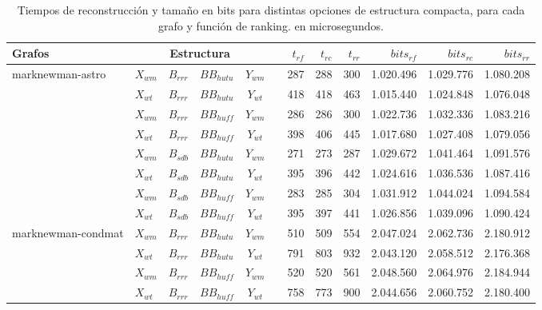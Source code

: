 \begin{table}
	\caption{Tiempos de reconstrucción y tamaño en bits para distintas opciones de estructura compacta, para cada grafo y función de ranking. en microsegundos.}
	\label{table:sdslTime}
	\centering
	\scriptsize
	\begin{tabular}{l||l|l|l|l|c||r|r|r||r|r|r}
		\toprule
		Grafos & \multicolumn{4}{c}{Estructura} & & $t_{rf}$ & $t_{rc}$ & $t_{rr}$ & $bits_{rf}$ & $bits_{rc}$  & $bits_{rr}$  \\
		\midrule
		\multirow{8}{*}{marknewman-astro} & $X_{wm}$ & $B_{rrr}$ & $BB_{hutu}$ & \multicolumn{1}{c}{$Y_{wm}$} & & 287 & 288 & 300 & 1.020.496 & 1.029.776 & 1.080.208 \\
		& $X_{wt}$ & $B_{rrr}$ & $BB_{hutu}$ & \multicolumn{1}{c}{$Y_{wt}$} & & 418 & 418 & 463 & 1.015.440 & 1.024.848 & 1.076.048 \\ 
		& $X_{wm}$ & $B_{rrr}$ & $BB_{huff}$ & \multicolumn{1}{c}{$Y_{wm}$} & & 286 & 286 & 300 & 1.022.736 & 1.032.336 & 1.083.216 \\ 
		& $X_{wt}$ & $B_{rrr}$ & $BB_{huff}$ & \multicolumn{1}{c}{$Y_{wt}$} & & 398 & 406 & 445 & 1.017.680 & 1.027.408 & 1.079.056 \\ 
		& $X_{wm}$ & $B_{sdb}$ & $BB_{hutu}$ & \multicolumn{1}{c}{$Y_{wm}$} & & 271 & 273 & 287 & 1.029.672 & 1.041.464 & 1.091.576 \\ 
		& $X_{wt}$ & $B_{sdb}$ & $BB_{hutu}$ & \multicolumn{1}{c}{$Y_{wt}$} & & 395 & 396 & 442 & 1.024.616 & 1.036.536 & 1.087.416 \\ 
		& $X_{wm}$ & $B_{sdb}$ & $BB_{huff}$ & \multicolumn{1}{c}{$Y_{wm}$} & & 283 & 285 & 304 & 1.031.912 & 1.044.024 & 1.094.584 \\ 
		& $X_{wt}$ & $B_{sdb}$ & $BB_{huff}$ & \multicolumn{1}{c}{$Y_{wt}$} & & 395 & 397 & 441 & 1.026.856 & 1.039.096 & 1.090.424 \\ 
		\hline
		\multirow{8}{*}{marknewman-condmat} & $X_{wm}$ & $B_{rrr}$ & $BB_{hutu}$ & \multicolumn{1}{c}{$Y_{wm}$} & & 510 & 509 & 554 & 2.047.024 & 2.062.736 & 2.180.912 \\
		& $X_{wt}$ & $B_{rrr}$ & $BB_{hutu}$ & \multicolumn{1}{c}{$Y_{wt}$} & & 791 & 803 & 932 & 2.043.120 & 2.058.512 & 2.176.368 \\ 
		& $X_{wm}$ & $B_{rrr}$ & $BB_{huff}$ & \multicolumn{1}{c}{$Y_{wm}$} & & 520 & 520 & 561 & 2.048.560 & 2.064.976 & 2.184.944 \\ 
		& $X_{wt}$ & $B_{rrr}$ & $BB_{huff}$ & \multicolumn{1}{c}{$Y_{wt}$} & & 758 & 773 & 900 & 2.044.656 & 2.060.752 & 2.180.400 \\ 

\end{tabular}
\end{table}
